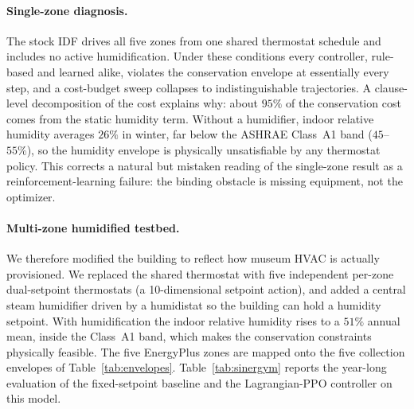 \paragraph{Single-zone diagnosis.}
The stock IDF drives all five zones from one shared thermostat schedule
and includes no active humidification. Under these conditions every
controller, rule-based and learned alike, violates the conservation
envelope at essentially every step, and a cost-budget sweep collapses
to indistinguishable trajectories. A clause-level decomposition of the
cost explains why: about $95\%$ of the conservation cost comes from the
static humidity term. Without a humidifier, indoor relative humidity
averages $26\%$ in winter, far below the ASHRAE Class~A1 band
($45$--$55\%$), so the humidity envelope is physically unsatisfiable by
any thermostat policy. This corrects a natural but mistaken reading of
the single-zone result as a reinforcement-learning failure: the
binding obstacle is missing equipment, not the optimizer.

\paragraph{Multi-zone humidified testbed.}
We therefore modified the building to reflect how museum HVAC is
actually provisioned. We replaced the shared thermostat with five
independent per-zone dual-setpoint thermostats (a 10-dimensional
setpoint action), and added a central steam humidifier driven by a
humidistat so the building can hold a humidity setpoint. With
humidification the indoor relative humidity rises to a $51\%$ annual
mean, inside the Class~A1 band, which makes the conservation
constraints physically feasible. The five EnergyPlus zones are mapped
onto the five collection envelopes of Table~\ref{tab:envelopes}.
Table~\ref{tab:sinergym} reports the year-long evaluation of the
fixed-setpoint baseline and the Lagrangian-PPO controller on this
model.

